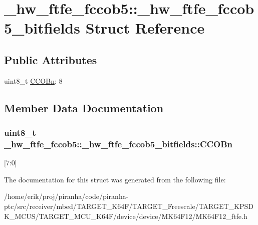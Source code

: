 \hypertarget{struct__hw__ftfe__fccob5_1_1__hw__ftfe__fccob5__bitfields}{}\section{\+\_\+hw\+\_\+ftfe\+\_\+fccob5\+:\+:\+\_\+hw\+\_\+ftfe\+\_\+fccob5\+\_\+bitfields Struct Reference}
\label{struct__hw__ftfe__fccob5_1_1__hw__ftfe__fccob5__bitfields}
\subsection*{Public Attributes}
\begin{DoxyCompactItemize}
\item 
uint8\+\_\+t \hyperlink{struct__hw__ftfe__fccob5_1_1__hw__ftfe__fccob5__bitfields_a1453ef653d326d0f9ef1e33008114f8f}{C\+C\+O\+Bn}\+: 8
\end{DoxyCompactItemize}


\subsection{Member Data Documentation}
\subsubsection[{\texorpdfstring{C\+C\+O\+Bn}{CCOBn}}]{\setlength{\rightskip}{0pt plus 5cm}uint8\+\_\+t \+\_\+hw\+\_\+ftfe\+\_\+fccob5\+::\+\_\+hw\+\_\+ftfe\+\_\+fccob5\+\_\+bitfields\+::\+C\+C\+O\+Bn}\hypertarget{struct__hw__ftfe__fccob5_1_1__hw__ftfe__fccob5__bitfields_a1453ef653d326d0f9ef1e33008114f8f}{}\label{struct__hw__ftfe__fccob5_1_1__hw__ftfe__fccob5__bitfields_a1453ef653d326d0f9ef1e33008114f8f}
\mbox{[}7\+:0\mbox{]} 

The documentation for this struct was generated from the following file\+:\begin{DoxyCompactItemize}
\item 
/home/erik/proj/piranha/code/piranha-\/ptc/src/receiver/mbed/\+T\+A\+R\+G\+E\+T\+\_\+\+K64\+F/\+T\+A\+R\+G\+E\+T\+\_\+\+Freescale/\+T\+A\+R\+G\+E\+T\+\_\+\+K\+P\+S\+D\+K\+\_\+\+M\+C\+U\+S/\+T\+A\+R\+G\+E\+T\+\_\+\+M\+C\+U\+\_\+\+K64\+F/device/device/\+M\+K64\+F12/M\+K64\+F12\+\_\+ftfe.\+h\end{DoxyCompactItemize}
